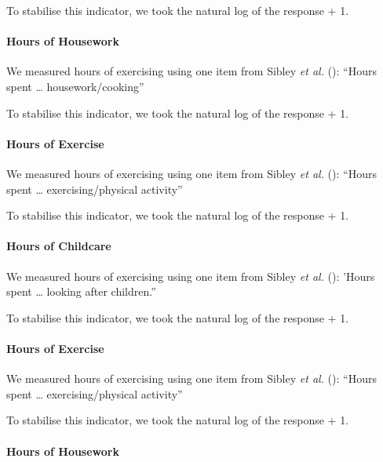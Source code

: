 \documentclass[
  single column]{article}
\let\oldparagraph\paragraph
\renewcommand{\paragraph}[1]{\oldparagraph{#1}\mbox{}}
\begin{document}
To stabilise this indicator, we took the natural log of the response +
1.

\paragraph{Hours of Housework}\label{hours-of-housework}

We measured hours of exercising using one item from Sibley \emph{et al.}
(): ``Hours spent \ldots{}
housework/cooking''

To stabilise this indicator, we took the natural log of the response +
1.

\paragraph{Hours of Exercise}\label{hours-of-exercise}

We measured hours of exercising using one item from Sibley \emph{et al.}
(): ``Hours spent \ldots{}
exercising/physical activity''

To stabilise this indicator, we took the natural log of the response +
1.

\paragraph{Hours of Childcare}\label{hours-of-childcare-1}

We measured hours of exercising using one item from Sibley \emph{et al.}
(): 'Hours spent \ldots{} looking after
children.''

To stabilise this indicator, we took the natural log of the response +
1.

\paragraph{Hours of Exercise}\label{hours-of-exercise-1}

We measured hours of exercising using one item from Sibley \emph{et al.}
(): ``Hours spent \ldots{}
exercising/physical activity''

To stabilise this indicator, we took the natural log of the response +
1.

\paragraph{Hours of Housework}\label{hours-of-housework-1}
\end{document}
